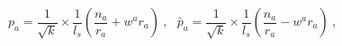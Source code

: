 \begin{equation}
p_a = \frac{1}{\sqrt{k}}\times
\frac{1}{l_s}\left(\frac{n_a}{r_a}+w^ar_a\right)  ~,~~~
\bar{p}_a = \frac{1}{\sqrt{k}}\times
\frac{1}{l_s}\left(\frac{n_a}{r_a}-w^ar_a\right) ~,
\label{T4 momenta 3}
\end{equation}

